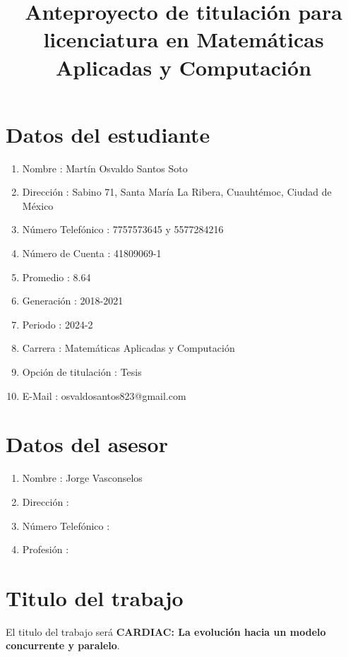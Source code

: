 \documentclass[letterpaper,12pt,oneside]{article}
\title{Anteproyecto de titulación para licenciatura en Matemáticas Aplicadas y Computación}
\begin{document}
    \maketitle
	
	\clearpage
	
	\section{Datos del estudiante}
	
	\begin{enumerate}
		\item Nombre : Martín Osvaldo Santos Soto
		\item Dirección : Sabino 71, Santa María La Ribera, Cuauhtémoc, Ciudad de México
		\item Número Telefónico : 7757573645 y 5577284216
		\item Número de Cuenta : 41809069-1
		\item Promedio : 8.64
		\item Generación : 2018-2021
		\item Periodo : 2024-2
		\item Carrera : Matemáticas Aplicadas y Computación
		\item Opción de titulación : Tesis
		\item E-Mail : osvaldosantos823@gmail.com
	\end{enumerate}
	
	\section{Datos del asesor}
		\begin{enumerate}
			\item Nombre : Jorge Vasconselos
		    \item Dirección : 
			\item Número Telefónico :
			\item Profesión : 
		
		\end{enumerate}		

	
		\section{Titulo del trabajo}
		
		El titulo del trabajo será \textbf{CARDIAC: La evolución hacia un modelo concurrente y paralelo}.
		
\end{document}
